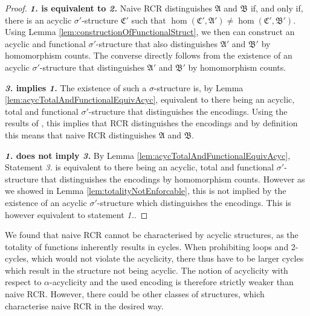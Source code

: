 \begin{proof}
	\textbf{\emph{1.} is equivalent to \emph{2.}}
	Naive RCR distinguishes $\mathfrak A$ and $\mathfrak B$ if, and only if, there is an acyclic $\sigma'$-structure $\mathfrak C'$ such that $\hom(\mathfrak C',\mathfrak A')\neq\hom(\mathfrak C',\mathfrak B')$.
	Using Lemma \ref{lem:constructionOfFunctionalStruct}, we then can construct an acyclic and functional $\sigma'$-structure that also distinguishes $\mathfrak A'$ and $\mathfrak B'$ by homomorphism counts.
	The converse directly follows from the existence of an acyclic $\sigma'$-structure that distinguishes $\mathfrak A'$ and $\mathfrak B'$ by homomorphism counts.

	\textbf{\emph{3.} implies \emph{1.}}
	The existence of such a $\sigma$-structure is, by Lemma \ref{lem:acycTotalAndFunctionalEquivAcyc}, equivalent to there being an acyclic, total and functional $\sigma'$-structure that distinguishes the encodings.
	Using the results of \cite{scheidt2025ColorRefinement}, this implies that RCR distinguishes the encodings and by definition this means that naive RCR distinguishes $\mathfrak A$ and $\mathfrak B$.
	
	\textbf{\emph{1.} does not imply \emph{3.}}
	By Lemma \ref{lem:acycTotalAndFunctionalEquivAcyc}, Statement \emph{3.} is equivalent to there being an acyclic, total and functional $\sigma'$-structure that distinguishes the encodings by homomorphism counts.
	However as we showed in Lemma \ref{lem:totalityNotEnforcable}, this is not implied by the existence of an acyclic $\sigma'$-structure which distinguishes the encodings. 
	This is however equivalent to statement \emph{1.}.
\end{proof}

We found that naive RCR cannot be characterised by acyclic structures, as the totality of functions inherently results in cycles. 
When prohibiting loops and 2-cycles, which would not violate the acyclicity, there thus have to be larger cycles which result in the structure not being acyclic.
The notion of acyclicity with respect to $\alpha$-acyclicity and the used encoding is therefore strictly weaker than naive RCR.
However, there could be other classes of structures, which characterise naive RCR in the desired way.


